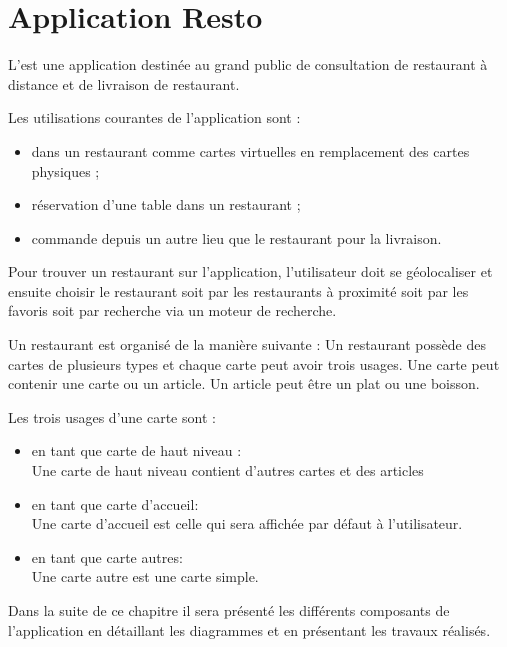 \chapter{Application Resto}
L'\ar est une application destinée au grand public de consultation de restaurant à distance et de livraison de restaurant.

Les utilisations courantes de l'application sont : 
\begin{itemize}
	\item dans un restaurant comme cartes virtuelles en remplacement des cartes physiques ;
	\item réservation d'une table dans un restaurant ;
	\item commande depuis un autre lieu que le restaurant pour la livraison.
\end{itemize}

Pour trouver un restaurant sur l'application, l'utilisateur doit se géolocaliser et ensuite choisir le restaurant soit par les restaurants à proximité soit par les favoris soit par recherche via un moteur de recherche.

Un restaurant est organisé de la manière suivante : Un restaurant possède des cartes de plusieurs types et chaque carte peut avoir trois usages. Une carte peut contenir une carte ou un article. Un article peut être un plat ou une boisson.

Les trois usages d'une carte sont : 
\begin{itemize}
	\item en tant que carte de haut niveau : \\
	Une carte de haut niveau contient d'autres cartes et des articles
	\item en tant que carte d'accueil: \\
	Une carte d'accueil est celle qui sera affichée par défaut à l'utilisateur.
	\item en tant que carte autres:\\
	Une carte autre est une carte simple. 
\end{itemize}

Dans la suite de ce chapitre il sera présenté les différents composants de l'application en détaillant les diagrammes et en présentant les travaux réalisés.

